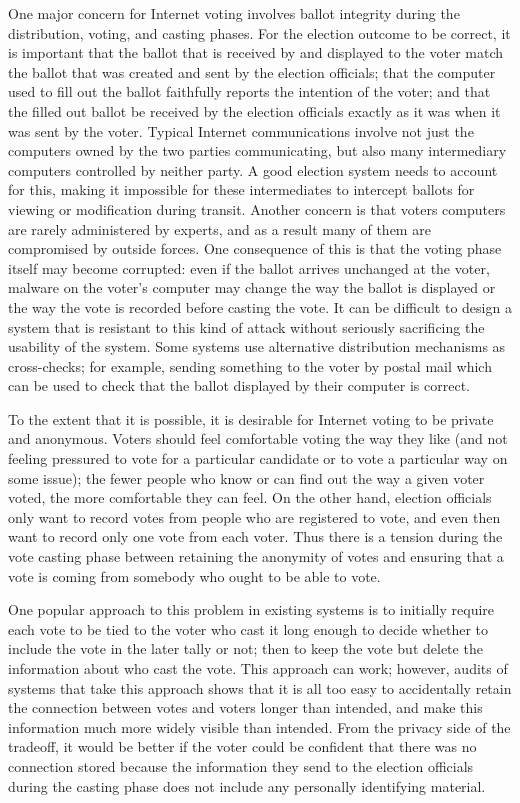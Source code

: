 One major concern for Internet voting involves ballot integrity during the
distribution, voting, and casting phases. For the election outcome to be
correct, it is important that the ballot that is received by and displayed
to the voter match the ballot that was created and sent by the election
officials; that the computer used to fill out the ballot faithfully reports
the intention of the voter; and that the filled out ballot be received by
the election officials exactly as it was when it was sent by the voter.
Typical Internet communications involve not just the computers owned by the
two parties communicating, but also many intermediary computers controlled
by neither party. A good election system needs to account for this, making
it impossible for these intermediates to intercept ballots for viewing or
modification during transit. Another concern is that voters computers are
rarely administered by experts, and as a result many of them are compromised
by outside forces. One consequence of this is that the voting phase itself
may become corrupted: even if the ballot arrives unchanged at the voter,
malware on the voter's computer may change the way the ballot is displayed
or the way the vote is recorded before casting the vote. It can be difficult
to design a system that is resistant to this kind of attack without
seriously sacrificing the usability of the system. Some systems use
alternative distribution mechanisms as cross-checks; for example, sending
something to the voter by postal mail which can be used to check that the
ballot displayed by their computer is correct.

To the extent that it is possible, it is desirable for Internet voting to be
private and anonymous. Voters should feel comfortable voting the way they
like (and not feeling pressured to vote for a particular candidate or to
vote a particular way on some issue); the fewer people who know or can find
out the way a given voter voted, the more comfortable they can feel. On the
other hand, election officials only want to record votes from people who are
registered to vote, and even then want to record only one vote from each
voter. Thus there is a tension during the vote casting phase between
retaining the anonymity of votes and ensuring that a vote is coming from
somebody who ought to be able to vote.

One popular approach to this problem in existing systems is to initially
require each vote to be tied to the voter who cast it long enough to decide
whether to include the vote in the later tally or not; then to keep the vote
but delete the information about who cast the vote. This approach can work;
however, audits of systems that take this approach shows that it is all too
easy to accidentally retain the connection between votes and voters longer
than intended, and make this information much more widely visible than
intended. From the privacy side of the tradeoff, it would be better if the
voter could be confident that there was no connection stored because the
information they send to the election officials during the casting phase
does not include any personally identifying material.

